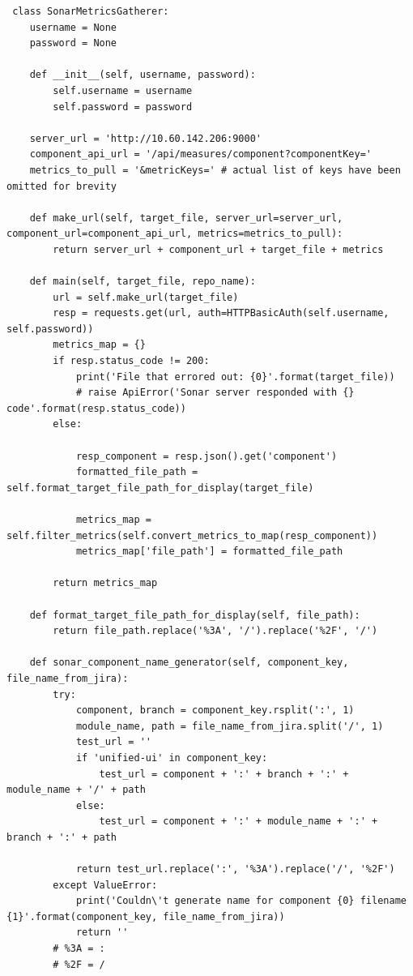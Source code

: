 \begin{landscape}
 \begin{code}
 \label{code:sonar-gatherer.py}
 \begin{verbatim}
 class SonarMetricsGatherer:
    username = None
    password = None

    def __init__(self, username, password):
        self.username = username
        self.password = password

    server_url = 'http://10.60.142.206:9000'
    component_api_url = '/api/measures/component?componentKey='
    metrics_to_pull = '&metricKeys=' # actual list of keys have been omitted for brevity

    def make_url(self, target_file, server_url=server_url, component_url=component_api_url, metrics=metrics_to_pull):
        return server_url + component_url + target_file + metrics

    def main(self, target_file, repo_name):
        url = self.make_url(target_file)
        resp = requests.get(url, auth=HTTPBasicAuth(self.username, self.password))
        metrics_map = {}
        if resp.status_code != 200:
            print('File that errored out: {0}'.format(target_file))
            # raise ApiError('Sonar server responded with {} code'.format(resp.status_code))
        else:

            resp_component = resp.json().get('component')
            formatted_file_path = self.format_target_file_path_for_display(target_file)

            metrics_map = self.filter_metrics(self.convert_metrics_to_map(resp_component))
            metrics_map['file_path'] = formatted_file_path

        return metrics_map

    def format_target_file_path_for_display(self, file_path):
        return file_path.replace('%3A', '/').replace('%2F', '/')

    def sonar_component_name_generator(self, component_key, file_name_from_jira):
        try:
            component, branch = component_key.rsplit(':', 1)
            module_name, path = file_name_from_jira.split('/', 1)
            test_url = ''
            if 'unified-ui' in component_key:
                test_url = component + ':' + branch + ':' + module_name + '/' + path
            else:
                test_url = component + ':' + module_name + ':' + branch + ':' + path
           
            return test_url.replace(':', '%3A').replace('/', '%2F')
        except ValueError:
            print('Couldn\'t generate name for component {0} filename {1}'.format(component_key, file_name_from_jira))
            return ''
        # %3A = :
        # %2F = /


\end{verbatim}
\end{code}
\end{landscape}
